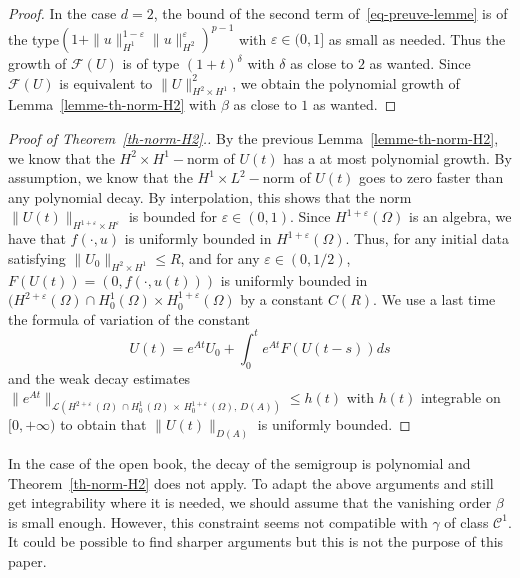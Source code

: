 \documentclass[AHL,Unicode,longabstracts]{cedram}
\newcommand{\Cc}{\mathcal{C}}
\newcommand{\Fc}{\mathcal{F}}
\newcommand{\Lc}{\mathcal{L}}
\begin{document}
\begin{proof}
In the case $d=2$, the bound of the second term of~\eqref{eq-preuve-lemme} is of the type\linebreak$(1+\|u\|_{H^1}^{1-\varepsilon}\|u\|_{H^2}^{\varepsilon})^{p-1}$ with $\varepsilon\in (0,1]$ as small as needed. Thus the growth of $\Fc(U)$ is of type $(1+t)^\delta$ with $\delta$ as close to $2$ as wanted. Since $\Fc(U)$ is equivalent to $\|U\|_{H^2\times H^1}^2$, we obtain the polynomial growth of Lemma~\ref{lemme-th-norm-H2} with $\beta$ as close to $1$ as wanted.
\end{proof}



\begin{proof}[{Proof of Theorem~\ref{th-norm-H2}.}]
By the previous Lemma~\ref{lemme-th-norm-H2}, we know that the $H^2\times H^1-$norm of $U(t)$ has a at most polynomial growth. By assumption, we know that the $H^1\times L^2-$norm of $U(t)$ goes to zero faster than any polynomial decay. By interpolation, this shows that the norm $\|U(t)\|_{H^{1+\varepsilon}\times H^\varepsilon}$ is bounded for $\varepsilon\in (0,1)$. Since $H^{1+\varepsilon}(\Omega)$ is an algebra, we have that $f(\cdot,u)$ is uniformly bounded in $H^{1+\varepsilon}(\Omega)$. Thus, for any initial data satisfying $\|U_0\|_{H^2\times H^1}\leq R$, and for any $\varepsilon \in (0,1/2)$, $F(U(t))=(0,f(\cdot,u(t)))$ is uniformly bounded in $(H^{2+\varepsilon}(\Omega)\cap H^1_0(\Omega)\times H^{1+\varepsilon}_0(\Omega)$ by a constant $C(R)$. We use a last time the formula of variation of the constant
\[
U(t)=e^{At}U_0 + \int_0^t e^{At} F(U(t-s)) ds
\]
and the weak decay estimates $\|e^{At}\|_{\Lc(H^{2+\varepsilon}\,(\Omega)\,\cap H^1_0\,(\Omega)\,\times\,H^{1+\varepsilon}_0\,(\Omega),\,D(A))}\leq h(t)$ with $h(t)$ integrable on $[0,+\infty)$ to obtain that $\|U(t)\|_{D(A)}$ is uniformly bounded. 
\end{proof}

\begin{rema}
In the case of the open book, the decay of the semigroup is polynomial and Theorem~\ref{th-norm-H2} does not apply. To adapt the above arguments and still get integrability where it is needed, we should assume that the vanishing order $\beta$ is small enough. However, this constraint seems not compatible with $\gamma$ of class $\Cc^1$. It could be possible to find sharper arguments but this is not the purpose of this paper.
\end{rema}



\appendix
\end{document}
